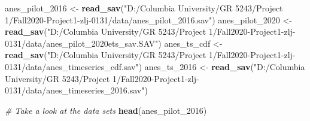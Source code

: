 \documentclass[
]{article}
\newenvironment{Shaded}{\begin{snugshade}}{\end{snugshade}}
\newcommand{\CommentTok}[1]{\textcolor[rgb]{0.56,0.35,0.01}{\textit{#1}}}
\newcommand{\DecValTok}[1]{\textcolor[rgb]{0.00,0.00,0.81}{#1}}
\newcommand{\KeywordTok}[1]{\textcolor[rgb]{0.13,0.29,0.53}{\textbf{#1}}}
\newcommand{\NormalTok}[1]{#1}
\newcommand{\StringTok}[1]{\textcolor[rgb]{0.31,0.60,0.02}{#1}}
\begin{document}
\begin{Shaded}
\begin{Highlighting}[]
\NormalTok{anes_pilot_}\DecValTok{2016}\NormalTok{ <-}\StringTok{ }\KeywordTok{read_sav}\NormalTok{(}\StringTok{"D:/Columbia University/GR 5243/Project 1/Fall2020-Project1-zlj-0131/data/anes_pilot_2016.sav"}\NormalTok{)}
\NormalTok{anes_pilot_}\DecValTok{2020}\NormalTok{ <-}\StringTok{ }\KeywordTok{read_sav}\NormalTok{(}\StringTok{"D:/Columbia University/GR 5243/Project 1/Fall2020-Project1-zlj-0131/data/anes_pilot_2020ets_sav.SAV"}\NormalTok{)}
\NormalTok{anes_ts_cdf <-}\StringTok{ }\KeywordTok{read_sav}\NormalTok{(}\StringTok{"D:/Columbia University/GR 5243/Project 1/Fall2020-Project1-zlj-0131/data/anes_timeseries_cdf.sav"}\NormalTok{)}
\NormalTok{anes_ts_}\DecValTok{2016}\NormalTok{ <-}\StringTok{ }\KeywordTok{read_sav}\NormalTok{(}\StringTok{"D:/Columbia University/GR 5243/Project 1/Fall2020-Project1-zlj-0131/data/anes_timeseries_2016.sav"}\NormalTok{)}

\CommentTok{# Take a look at the data sets}
\KeywordTok{head}\NormalTok{(anes_pilot_}\DecValTok{2016}\NormalTok{)}
\end{Highlighting}
\end{Shaded}
\end{document}

